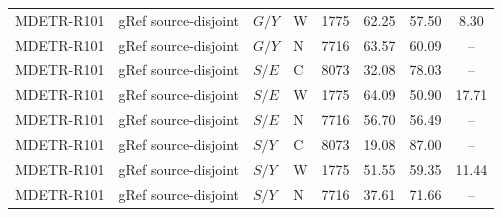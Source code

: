 \begin{table}[t]
\begin{tabular}{@{}llllcccc@{}}
MDETR-R101 & gRef source-disjoint & $G/Y$ & W & 1775 & 62.25 & 57.50 & 8.30\\
MDETR-R101 & gRef source-disjoint & $G/Y$ & N & 7716 & 63.57 & 60.09 & --\\
MDETR-R101 & gRef source-disjoint & $S/E$ & C & 8073 & 32.08 & 78.03 & --\\
MDETR-R101 & gRef source-disjoint & $S/E$ & W & 1775 & 64.09 & 50.90 & 17.71\\
MDETR-R101 & gRef source-disjoint & $S/E$ & N & 7716 & 56.70 & 56.49 & --\\
MDETR-R101 & gRef source-disjoint & $S/Y$ & C & 8073 & 19.08 & 87.00 & --\\
MDETR-R101 & gRef source-disjoint & $S/Y$ & W & 1775 & 51.55 & 59.35 & 11.44\\
MDETR-R101 & gRef source-disjoint & $S/Y$ & N & 7716 & 37.61 & 71.66 & --\\
\bottomrule\end{tabular}
\end{table}


